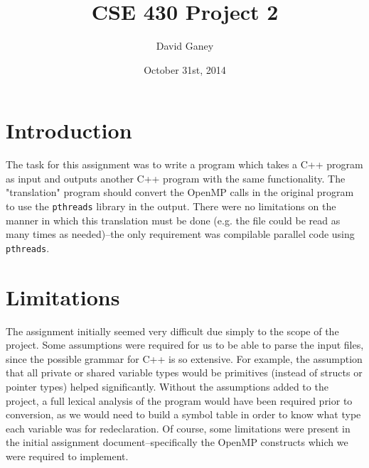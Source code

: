 \documentclass[]{article}
\begin{document}
\lstset{language=C++}

\begin{spacing}{.4}
\setlength{\droptitle}{-7em}
\title{CSE 430 Project 2}
\author{David Ganey}
\date{October 31st, 2014}
\maketitle
\end{spacing}

\section{Introduction}
The task for this assignment was to write a program which takes a C++ program as input and outputs another C++ program with the same functionality. The "translation" program should convert the OpenMP calls in the original program to use the \texttt{pthreads} library in the output. There were no limitations on the manner in which this translation must be done (e.g. the file could be read as many times as needed)--the only requirement was compilable parallel code using \texttt{pthreads}.

\section{Limitations}
The assignment initially seemed very difficult due simply to the scope of the project. Some assumptions were required for us to be able to parse the input files, since the possible grammar for C++ is so extensive. For example, the assumption that all private or shared variable types would be primitives (instead of structs or pointer types) helped significantly. Without the assumptions added to the project, a full lexical analysis of the program would have been required prior to conversion, as we would need to build a symbol table in order to know what type each variable was for redeclaration. Of course, some limitations were present in the initial assignment document--specifically the OpenMP constructs which we were required to implement.
\end{document}
